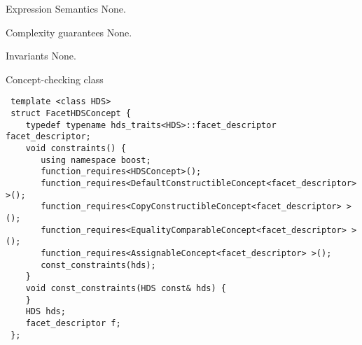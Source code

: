 \begin{Desc}
\item[Expression Semantics]None.\end{Desc}
\begin{Desc}
\item[Complexity guarantees]None.\end{Desc}
\begin{Desc}
\item[Invariants]None.\end{Desc}
\begin{Desc}
\item[Concept-checking class]

\begin{Code}\begin{verbatim} template <class HDS> 
 struct FacetHDSConcept {
    typedef typename hds_traits<HDS>::facet_descriptor facet_descriptor; 
    void constraints() {
       using namespace boost;
       function_requires<HDSConcept>();
       function_requires<DefaultConstructibleConcept<facet_descriptor> >();
       function_requires<CopyConstructibleConcept<facet_descriptor> >();
       function_requires<EqualityComparableConcept<facet_descriptor> >();
       function_requires<AssignableConcept<facet_descriptor> >();
       const_constraints(hds);
    }
    void const_constraints(HDS const& hds) {
    }
    HDS hds;
    facet_descriptor f;
 };
\end{verbatim}\end{Code}

 \end{Desc}
